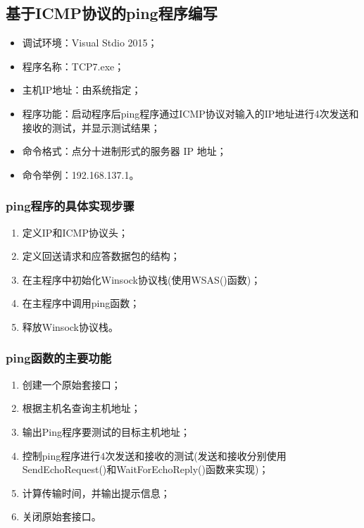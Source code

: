 \documentclass[a4paper]{ctexrep}
\begin{document}
\begin{spacing}{1.5}
\subsection{基于ICMP协议的ping程序编写}

\begin{itemize}
	\item 调试环境：Visual Stdio 2015；
	\item 程序名称：TCP7.exe；
	\item 主机IP地址：由系统指定；
	\item 程序功能：启动程序后ping程序通过ICMP协议对输入的IP地址进行4次发送和接收的测试，并显示测试结果；
	\item 命令格式：点分十进制形式的服务器 IP 地址；
	\item 命令举例：192.168.137.1。
\end{itemize}

\subsubsection{ping程序的具体实现步骤}
\begin{enumerate}
	\item 定义IP和ICMP协议头；
	\item 定义回送请求和应答数据包的结构；
	\item 在主程序中初始化Winsock协议栈(使用WSAS()函数)；
	\item 在主程序中调用ping函数；
	\item 释放Winsock协议栈。
\end{enumerate}

\subsubsection{ping函数的主要功能}
\begin{enumerate}
	\item 创建一个原始套接口；
	\item 根据主机名查询主机地址；
	\item 输出Ping程序要测试的目标主机地址；
	\item 控制ping程序进行4次发送和接收的测试(发送和接收分别使用SendEchoRequest()和WaitForEchoReply()函数来实现)；
	\item 计算传输时间，并输出提示信息；
	\item 关闭原始套接口。
\end{enumerate}


\end{spacing}
\end{document}
